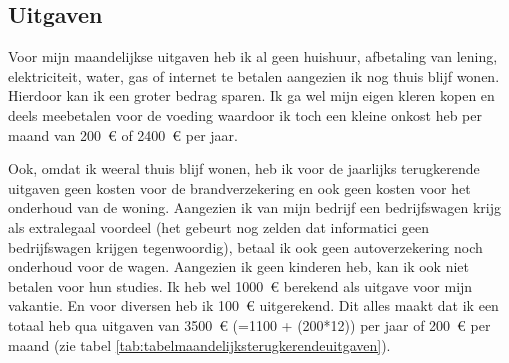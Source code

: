 \newpage
\subsection{Uitgaven}

Voor mijn maandelijkse uitgaven heb ik al geen huishuur, afbetaling van lening, elektriciteit, water, gas of internet te betalen aangezien ik nog thuis blijf wonen. Hierdoor kan ik een groter bedrag sparen. Ik ga wel mijn eigen kleren kopen en deels meebetalen voor de voeding waardoor ik toch een kleine onkost heb per maand van 200~\euro{} of 2400~\euro{} per jaar.

Ook, omdat ik weeral thuis blijf wonen, heb ik voor de jaarlijks terugkerende uitgaven geen kosten voor de brandverzekering en ook geen kosten voor het onderhoud van de woning. Aangezien ik van mijn bedrijf een bedrijfswagen krijg als extralegaal voordeel (het gebeurt nog zelden dat informatici geen bedrijfswagen krijgen tegenwoordig), betaal ik ook geen autoverzekering noch onderhoud voor de wagen. Aangezien ik geen kinderen heb, kan ik ook niet betalen voor hun studies. Ik heb wel 1000~\euro{} berekend als uitgave voor mijn vakantie. En voor diversen heb ik 100~\euro{} uitgerekend. Dit alles maakt dat ik een totaal heb qua uitgaven van 3500~\euro{} (=1100 + (200*12)) per jaar of 200~\euro{} per maand (zie tabel \ref{tab:tabelmaandelijksterugkerendeuitgaven}).

%

